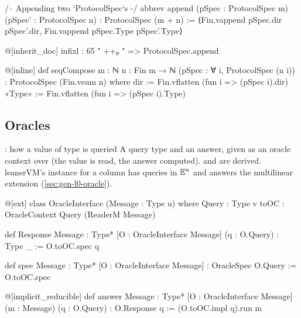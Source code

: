 \begin{leancode}
/-- Appending two `ProtocolSpec`s -/
abbrev append (pSpec : ProtocolSpec m) (pSpec' : ProtocolSpec n) : ProtocolSpec (m + n) :=
  ⟨Fin.vappend pSpec.dir pSpec'.dir, Fin.vappend pSpec.Type pSpec'.Type⟩

@[inherit_doc]
infixl : 65 " ++ₚ " => ProtocolSpec.append
\end{leancode}



\begin{leancode}
@[inline]
def seqCompose {m : ℕ} {n : Fin m → ℕ} (pSpec : ∀ i, ProtocolSpec (n i)) :
    ProtocolSpec (Fin.vsum n) where
  dir := Fin.vflatten (fun i => (pSpec i).dir)
  «Type» := Fin.vflatten (fun i => (pSpec i).Type)
\end{leancode}


\subsection{Oracles}\label{sec:gen-lib-ark-oracleinterface}

\begin{define}{: how a value of type  is queried}
A query type and an answer, given as an oracle context over  (the value is read,
the answer computed).  and  are derived. leanerVM's instance for
a column has queries in $\mathbb{E}^n$ and answers the multilinear extension
(\cref{sec:gen-l0-oracle}).
\end{define}

\begin{leancode}
@[ext]
class OracleInterface (Message : Type u) where
  Query : Type v
  toOC : OracleContext Query (ReaderM Message)
\end{leancode}



\begin{leancode}
def Response {Message : Type*} [O : OracleInterface Message]
    (q : O.Query) : Type _ :=
  O.toOC.spec q

def spec {Message : Type*} [O : OracleInterface Message] :
    OracleSpec O.Query :=
  O.toOC.spec

@[implicit_reducible]
def answer {Message : Type*} [O : OracleInterface Message]
    (m : Message) (q : O.Query) : O.Response q :=
  (O.toOC.impl q).run m
\end{leancode}

